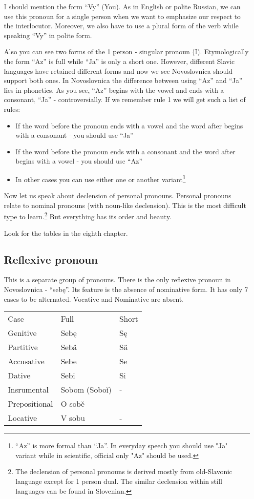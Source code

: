 I should mention the form “Vy” (You). As in English or polite Russian, we can use this pronoun for a single person when we want to emphasize our respect to the interlocutor. Moreover, we also have to use a plural form of the verb while speaking “Vy” in polite form.

Also you can see two forms of the 1 person - singular pronoun (I). Etymologically the form “Az” is full while “Ja” is only a short one. However, different Slavic languages have retained different forms and now we see Novoslovnica should support both ones. In Novoslovnica the difference between using “Az” and “Ja” lies in phonetics. As you see, “Az” begins with the vowel and ends with a consonant, “Ja” - controversially. If we remember rule 1 we will get such a list of rules:

\begin{itemize}
	\item If the word before the pronoun ends with a vowel and the word after begins with a consonant - you should use “Ja”
	\item If the word before the pronoun ends with a consonant and the word after begins with a vowel - you should use “Az”
	\item In other cases you can use either one or another variant\footnote{“Az” is more formal than “Ja”. In everyday speech you should use "Ja" variant while in scientific, official only "Az" should be used.}
\end{itemize}

Now let us speak about declension of personal pronouns. Personal pronouns relate to nominal pronouns (with noun-like declension). This is the most difficult type to learn.\footnote{The declension of personal pronouns is derived mostly from old-Slavonic language except for 1 person dual. The similar declension within still languages can be found in Slovenian.} But everything has its order and beauty.

Look for the tables in the eighth chapter.

\subsection{Reflexive pronoun}

This is a separate group of pronouns. There is the only reflexive pronoun in Novoslovnica - “sebę”. Its feature is the absence of nominative form. It has only 7 cases to be alternated. Vocative and Nominative are absent.

\begin{table}[!htb]
	\begin{tabular}{lll}
		Case & Full & Short \\
		Genitive & Sebę & Sę \\
		Partitive & Sebä & Sä \\
		Accusative & Sebe & Se \\
		Dative & Sebi & Si \\ 
		Insrumental & Sobom (Soboǐ) & - \\ 
		Prepositional & O sobě & - \\
		Locative & V sobu & -
	\end{tabular}
\end{table}


